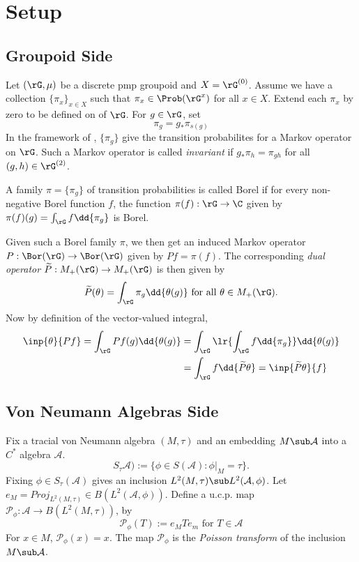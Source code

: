 \documentclass[../main.tex]{subfiles}
\begin{document}
\section{Setup}

\subsection{Groupoid Side}

Let $ (\rG, \mu) $ be a discrete pmp groupoid and $ X = \rG^{(0)} $. Assume we have a collection $ \{\pi_{x}\}_{x\in X} $ such that $ \pi_{x}\in \Prob(\rG^{x}) $ for all $ x\in X $. Extend each $ \pi_{x} $ by zero to be defined on of $ \rG $. For $ g\in \rG $, set
\[
    \pi_{g} = g_{*}\pi_{s(g)}
\]
In the framework of \cite{kai:05}, $ \{\pi_{g}\} $ give the transition probabilites for a Markov operator on $ \rG $. Such a Markov operator is called \textit{invariant} if $ g_{*} \pi_{h} = \pi_{gh} $ for all $(g,h) \in \rG^{(2)} $.\\


\begin{definition}
  A family $ \pi = \{\pi_{g}\} $ of transition probabilities is called Borel if for every non-negative Borel function $ f $, the function $ \pi(f):\rG\to \C $ given by $ \pi(f)(g) = \int_{\rG} f \dd{\pi_{g}} $ is Borel. 
\end{definition}

Given such a Borel family $ \pi $, we then get an induced Markov operator $ P:\Bor(\rG)\to\Bor(\rG) $ given by $ Pf = \pi(f) $. The corresponding \textit{dual operator} $ \widetilde{P}:M_{+}(\rG)\to M_{+}(\rG) $ is then given by 
\[
  \widetilde{P}(\theta) = \int_{\rG} \pi_{g} \dd{\theta(g)} \text{ for all } \theta\in M_{+}(\rG).
\]
Now by definition of the vector-valued integral,
\begin{align*}
  \inp{\theta}{Pf} = \int_{\rG} Pf(g) \dd{\theta(g)} &= \int_{\rG} \lr{\int_{\rG}f \dd{\pi_{g}}} \dd{\theta(g)}\\
  &= \int_{\rG} f \dd{\widetilde{P} \theta} = \inp{\widetilde{P} \theta}{f}
\end{align*}



\subsection{Von Neumann Algebras Side}


Fix a tracial von Neumann algebra $ (M,\tau) $ and an embedding $ M\sub \mathcal{A} $ into a $ C^{*} $ algebra $ \mathcal{A} $.
\[
  S_{\tau}\mathcal{A}) := \{\phi\in S(\mathcal{A}) : \phi\vert_{M} = \tau\}.
\]
Fixing $ \phi\in S_{\tau}(\mathcal{A}) $ gives an inclusion $ L^{2}(M,\tau)\sub L^{2}(\mathcal{A},\phi) $. Let $ e_{M} = Proj_{L^{2}(M,\tau)}\in B(L^{2}(\mathcal{A},\phi)) $. Define a u.c.p. map $ \mathcal{P}_{\phi}:\mathcal{A} \to B(L^{2}(M,\tau))$, by
\[
  \mathcal{P}_{\phi}(T) := e_{M}Te_{m} \text{ for }T\in \mathcal{A}
\]
For $ x\in M $, $ \mathcal{P}_{\phi}(x) = x $. The map $ \mathcal{P}_{\phi} $ is the \textit{Poisson transform} of the inclusion $ M\sub \mathcal{A} $. 
\end{document}
